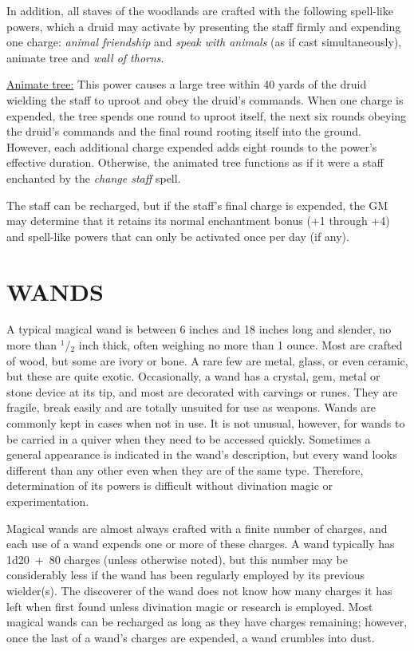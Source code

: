 \begin{multicols}{2}
In addition, all staves of the woodlands are crafted with the following spell-like powers, which a druid may activate by presenting the staff firmly and expending one charge: \textit{animal friendship} and \textit{speak with animals} (as if cast simultaneously), animate tree and \textit{wall of thorns}.

\underline{Animate tree:} This power causes a large tree within 40 yards of the druid wielding the staff to uproot and obey the druid's commands.  When one charge is expended, the tree spends one round to uproot itself, the next six rounds obeying the druid's commands and the final round rooting itself into the ground.  However, each additional charge expended adds eight rounds to the power's effective duration.  Otherwise, the animated tree functions as if it were a staff enchanted by the \textit{change staff} spell.  

The staff can be recharged, but if the staff's final charge is expended, the GM may determine that it retains its normal enchantment bonus (+1 through +4) and spell-like powers that can only be activated once per day (if any).

\section{WANDS}

A typical magical wand is between 6 inches and 18 inches long and slender, no more than $^1$/$_2$ inch thick, often weighing no more than 1 ounce.  Most are crafted of wood, but some are ivory or bone.  A rare few are metal, glass, or even ceramic, but these are quite exotic.  Occasionally, a wand has a crystal, gem, metal or stone device at its tip, and most are decorated with carvings or runes.  They are fragile, break easily and are totally unsuited for use as weapons.  Wands are commonly kept in cases when not in use.  It is not unusual, however, for wands to be carried in a quiver when they need to be accessed quickly.  Sometimes a general appearance is indicated in the wand's description, but every wand looks different than any other even when they are of the same type.  Therefore, determination of its powers is difficult without divination magic or experimentation. 

Magical wands are almost always crafted with a finite number of charges, and each use of a wand expends one or more of these charges.  A wand typically has 1d20~+~80 charges (unless otherwise noted), but this number may be considerably less if the wand has been regularly employed by its previous wielder(s).  The discoverer of the wand does not know how many charges it has left when first found unless divination magic or research is employed.  Most magical wands can be recharged as long as they have charges remaining; however, once the last of a wand's charges are expended, a wand crumbles into dust.


\end{multicols}
